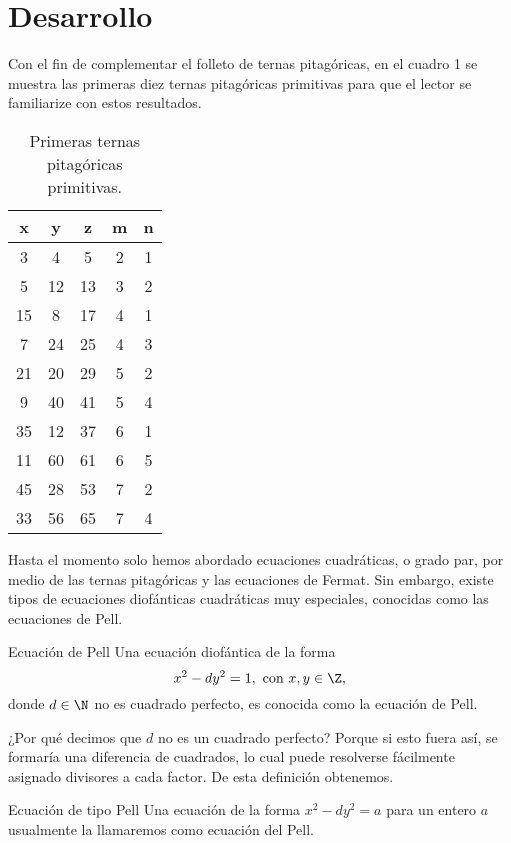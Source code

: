 \section{Desarrollo}

Con el fin de complementar el folleto de ternas pitagóricas, en el cuadro 1 se muestra las primeras diez ternas
pitagóricas primitivas para que el lector se familiarize con estos resultados.
\begin{table}[h]
    \centering
    \begin{tabular}{|c|c|c||c|c|}
        \hline
        x & y & z & m & n\\
        \hline\hline
        3  &  4 &  5 & 2 & 1\\
        5  & 12 & 13 & 3 & 2\\
        15 &  8 & 17 & 4 & 1\\
        7  & 24 & 25 & 4 & 3\\
        21 & 20 & 29 & 5 & 2\\
        9  & 40 & 41 & 5 & 4\\
        35 & 12 & 37 & 6 & 1\\
        11 & 60 & 61 & 6 & 5\\
        45 & 28 & 53 & 7 & 2\\
        33 & 56 & 65 & 7 & 4\\
        \hline
    \end{tabular}
    \caption{Primeras ternas pitagóricas primitivas.}
\end{table}

Hasta el momento solo hemos abordado ecuaciones cuadráticas, o grado par, por medio de las ternas pitagóricas y
las ecuaciones de Fermat.
Sin embargo, existe tipos de ecuaciones diofánticas cuadráticas muy especiales, conocidas como las ecuaciones de Pell.

\begin{definition.box}{Ecuación de Pell}{}
    Una ecuación diofántica de la forma
    \[
        x^2 - dy^2 = 1, \ \text{con} \ x,y \in \Z,
    \]
    donde $d \in \N$ no es cuadrado perfecto, es conocida como la ecuación de Pell.
\end{definition.box}

¿Por qué decimos que $d$ no es un cuadrado perfecto?
Porque si esto fuera así, se formaría una diferencia de cuadrados, lo cual puede resolverse fácilmente asignado divisores a cada factor.
De esta definición obtenemos.

\begin{definition.box}{Ecuación de tipo Pell}{}
    Una ecuación de la forma $x^2 - dy^2 = a$ para un entero $a$ usualmente la llamaremos como ecuación del Pell.
\end{definition.box}

